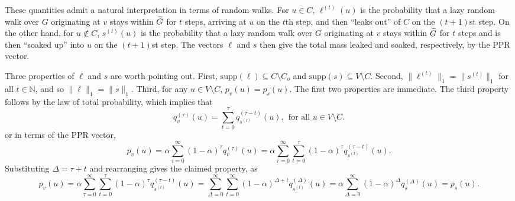 These quantities admit a natural interpretation in terms of random walks. For $u \in C$, $\ell^{(t)}(u)$ is the probability that a lazy random walk over $G$ originating at $v$ stays within $\widetilde{G}$ for $t$ steps, arriving at $u$ on the $t$th step, and then ``leaks out'' of $C$ on the $(t + 1)$st step. On the other hand, for $u \not\in C$, $s^{(t)}(u)$ is the probability that a lazy random walk over $G$ originating at $v$ stays within $\widetilde{G}$ for $t$ steps and is then ``soaked up'' into $u$ on the $(t + 1)$st step. The vectors $\ell$ and $s$ then give the total mass leaked and soaked, respectively, by the PPR vector. 

Three properties of $\ell$ and $s$ are worth pointing out. First, $\mathrm{supp}(\ell) \subseteq C \setminus C_o$ and $\mathrm{supp}(s) \subseteq V \setminus C$. Second, $\|\ell^{(t)}\|_1 = \|s^{(t)}\|_1$ for all $t \in \mathbb{N}$, and so $\|\ell\|_1 = \|s\|_1$. Third, for any $u \in V \setminus C$, $p_v(u) = p_s(u)$. The first two properties are immediate. The third property follows by the law of total probability, which implies that
\begin{equation*}
q_v^{(\tau)}(u) = \sum_{t = 0}^{\tau} q_{s^{(t)}}^{(\tau - t)}(u),~~\textrm{for all $u \in V \setminus C$.}
\end{equation*}
or in terms of the PPR vector,
\begin{equation*}
p_v(u) = \alpha \sum_{\tau = 0}^{\infty} (1 - \alpha)^{\tau} q_v^{(\tau)}(u) = \alpha \sum_{\tau = 0}^{\infty} \sum_{t = 0}^{\tau} (1 - \alpha)^{\tau} q_{s^{(t)}}^{(\tau - t)}(u).
\end{equation*}
Substituting $\Delta = \tau + t$ and rearranging gives the claimed property, as
\begin{equation*}
p_v(u) = \alpha \sum_{\tau = 0}^{\infty} \sum_{t = 0}^{\tau} (1 - \alpha)^{\tau} q_{s^{(t)}}^{(\tau - t)}(u) = \sum_{\Delta = 0}^{\infty} \sum_{t = 0}^{\infty} (1 - \alpha)^{\Delta + t} q_{s^{(t)}}^{(\Delta)}(u) = \alpha \sum_{\Delta = 0}^{\infty} (1 - \alpha)^{\Delta} q_s^{(\Delta)}(u) = p_s(u).
\end{equation*}

